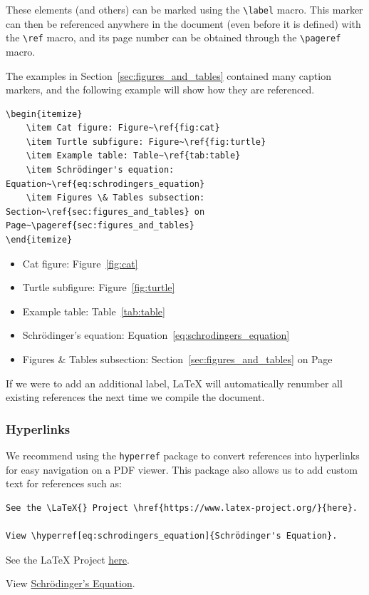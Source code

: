 \documentclass[11pt, twoside]{article}
\begin{document}
These elements (and others) can be marked using the \lstinline{\label} macro. This marker can then be referenced anywhere in the document (even before it is defined) with the \lstinline{\ref} macro, and its page number can be obtained through the \lstinline{\pageref} macro.

The examples in Section~\ref{sec:figures_and_tables} contained many caption markers, and the following example will show how they are referenced.
\begin{lstlisting}
\begin{itemize}
    \item Cat figure: Figure~\ref{fig:cat}
    \item Turtle subfigure: Figure~\ref{fig:turtle}
    \item Example table: Table~\ref{tab:table}
    \item Schrödinger's equation: Equation~\ref{eq:schrodingers_equation}
    \item Figures \& Tables subsection: Section~\ref{sec:figures_and_tables} on Page~\pageref{sec:figures_and_tables}
\end{itemize}
\end{lstlisting}
\begin{outputbox}
    \begin{itemize}
        \item Cat figure: Figure~\ref{fig:cat}
        \item Turtle subfigure: Figure~\ref{fig:turtle}
        \item Example table: Table~\ref{tab:table}
        \item Schrödinger's equation: Equation~\ref{eq:schrodingers_equation}
        \item Figures \& Tables subsection: Section~\ref{sec:figures_and_tables} on Page~\pageref{sec:figures_and_tables}
    \end{itemize}
\end{outputbox}
If we were to add an additional label, \LaTeX{} will automatically renumber all existing references the next time we compile the document.
\subsubsection{Hyperlinks}
We recommend using the \lstinline{hyperref} package to convert references into hyperlinks for easy navigation on a PDF viewer.
This package also allows us to add custom text for references such as:
\begin{lstlisting}
See the \LaTeX{} Project \href{https://www.latex-project.org/}{here}.

View \hyperref[eq:schrodingers_equation]{Schrödinger's Equation}.
\end{lstlisting}
\begin{outputbox}
    See the \LaTeX{} Project \href{https://www.latex-project.org/}{here}.

    View \hyperref[eq:schrodingers_equation]{Schrödinger's Equation}.
\end{outputbox}
\newpage
\end{document}

